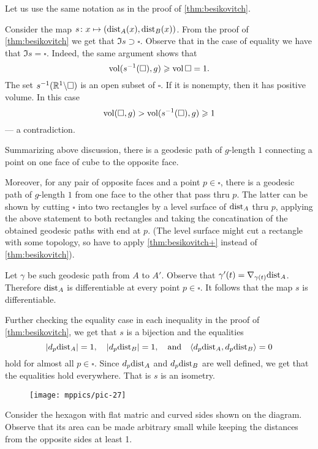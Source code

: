 Let us use the same notation as in the proof of \ref{thm:besikovitch}.

Consider the map $s\colon x\mapsto(\mathrm{dist}_A(x),\mathrm{dist}_B(x))$.
From the proof of \ref{thm:besikovitch} we get that $\Im s\supset \square$.
Observe that in the case of equality we have that $\Im s= \square$.
Indeed,
the same argument shows that 
\[\operatorname{\rm vol}\nolimits(s^{-1}(\square),g)\geqslant \operatorname{\rm vol}\nolimits\square=1.\]
The set $s^{-1}(\mathbb{R}^1\backslash \square)$ is an open subset of $\square$.
If it is nonempty, then it has positive volume.
In this case
\[\operatorname{\rm vol}\nolimits(\square,g)>\operatorname{\rm vol}\nolimits(s^{-1}(\square),g)\geqslant 1\]
--- a contradiction.

Summarizing above discussion, there is a geodesic path of $g$-length $1$ connecting a point on one face of cube to the opposite face.

Moreover, for any pair of opposite faces and a point $p\in\square$, there is a geodesic path of $g$-length $1$ from one face to the other that pass thru $p$.
The latter can be shown by cutting $\square$ into two rectangles by a level surface of $\mathrm{dist}_A$ thru $p$,
applying the above statement to both rectangles and taking the concatination of the obtained geodesic paths with end at $p$.
(The level surface might cut a rectangle with some topology, so have to apply \ref{thm:besikovitch+} instead of \ref{thm:besikovitch}).

Let $\gamma$ be such geodesic path from $A$ to $A'$.
Observe that $\gamma'(t)\z=\nabla_{\gamma(t)}\distfun_A$.
Therefore $\mathrm{dist}_A$ is differentiable at every point $p\in \square$.
It follows that the map $s$ is differentiable.

Further checking the equality case in each inequality in the proof of \ref{thm:besikovitch}, we get that $s$ is a bijection and the equalities
\[|d_{p}\mathrm{dist}_A|= 1,\quad|d_{p}\mathrm{dist}_B|=1,\quad \text{and}\quad \langle d_{p}\mathrm{dist}_A,d_{p}\mathrm{dist}_B\rangle= 0\]
hold for almost all $p\in\square$.
Since $d_{p}\mathrm{dist}_A$ and $d_{p}\mathrm{dist}_B$ are well defined, we get that the equalities hold everywhere.
That is $s$ is an isometry.

\begin{wrapfigure}{r}{45 mm}
\vskip-4mm
\centering
\texttt{[image: mppics/pic-27]}
\end{wrapfigure}

Consider the hexagon with flat matric and curved sides shown on the diagram.
Observe that its area can be made arbitrary small while keeping the distances from the opposite sides at least 1.

